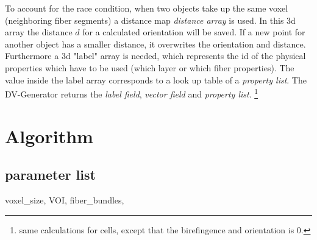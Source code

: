 % 
To account for the race condition, when two objects take up the same voxel (\eg neighboring fiber segments) a distance map \textit{distance array} is used.
In this 3d array the distance $d$ for a calculated orientation will be saved.
If a new point for another object has a smaller distance, it overwrites the orientation and distance.
Furthermore a 3d "label" array is needed, which represents the id of the physical properties which have to be used (\eg which layer or which fiber properties).
The value inside the label array corresponds to a look up table of a \textit{property list}.
% 
The DV-Generator returns the \textit{label field}, \textit{vector field} and \textit{property list}.
% 
\footnote{same calculations for cells, except that the birefingence and orientation is 0.}
% 
\section{Algorithm}
% 
\subsection{parameter list}
% 
voxel\_size, VOI, fiber\_bundles, \dummy
% 
